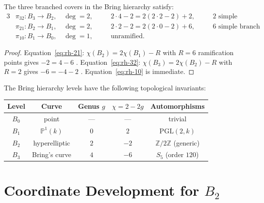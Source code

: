 \begin{proposition}
\label{prop:rh-hierarchy}
The three branched covers in the Bring hierarchy satisfy:
\begin{alignat}{3}
  &\pi_{32}\colon B_3\to B_2,\quad\deg=2,
  &&\quad 2\cdot 4 - 2 = 2(2\cdot 2-2)+2,
  &&\quad\text{$2$ simple ramification points,}
  \label{eq:rh-32}\\[4pt]
  &\pi_{21}\colon B_2\to B_1,\quad\deg=2,
  &&\quad 2\cdot 2 - 2 = 2(2\cdot 0-2)+6,
  &&\quad\text{$6$ simple branch points,}
  \label{eq:rh-21}\\[4pt]
  &\pi_{10}\colon B_1\to B_0,\quad\deg=1,
  &&\quad \text{unramified.}
  &&
  \label{eq:rh-10}
\end{alignat}
\end{proposition}
\begin{proof}
Equation~\eqref{eq:rh-21}: $\chi(B_2) = 2\chi(B_1) - R$ with $R=6$
ramification points gives $-2 = 4 - 6$ \checkmark.
Equation~\eqref{eq:rh-32}: $\chi(B_3) = 2\chi(B_2) - R$ with $R=2$
gives $-6 = -4 - 2$ \checkmark.  Equation~\eqref{eq:rh-10} is immediate.
\end{proof}

\begin{remark}
\label{rem:hierarchy-genera}
The Bring hierarchy levels have the following topological invariants:
\begin{center}
\renewcommand{\arraystretch}{1.3}
\begin{tabular}{ccccc}
\hline
Level & Curve & Genus $g$ & $\chi = 2-2g$ & Automorphisms \\
\hline
$B_0$ & point & --- & --- & trivial \\
$B_1$ & $\mathbb{P}^1(k)$ & $0$ & $2$ & $\mathrm{PGL}(2,k)$ \\
$B_2$ & hyperelliptic & $2$ & $-2$ & $\mathbb{Z}/2\mathbb{Z}$ (generic) \\
$B_3$ & Bring's curve & $4$ & $-6$ & $S_5$ (order $120$) \\
\hline
\end{tabular}
\end{center}
\end{remark}


\section{Coordinate Development for $B_2$}
\label{sec:B2-coordinates}

